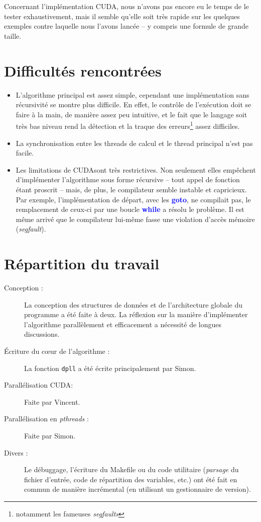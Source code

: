 \documentclass{article}
\newcommand{\keyword}[1]{\textbf{\textcolor{blue}{#1}}}
\newcommand{\code}[1]{\texttt{{#1}}}
\newcommand{\cuda}{\textsc{CUDA}}
\begin{document}
    Concernant l'implémentation \cuda, nous n'avons pas encore eu le temps de le tester exhaustivement, mais il semble qu'elle soit très rapide sur les quelques exemples contre laquelle nous l'avons lancée -- y compris une formule de grande taille.

\section{Difficultés rencontrées}
\begin{itemize}
    \item L'algorithme principal est assez simple, cependant une implémentation sans récursivité se montre plus difficile. En effet, le contrôle de l'exécution doit se faire à la main, de manière assez peu intuitive, et le fait que le langage soit très bas niveau rend la détection et la traque des erreurs\footnote{notamment les fameuses \emph{segfaults}} assez difficiles.
    \item La synchronisation entre les threads de calcul et le thread principal n'est pas facile.
    \item Les limitations de \cuda sont très restrictives. Non seulement elles empêchent d'implémenter l'algorithme sous forme récursive -- tout appel de fonction étant proscrit -- mais, de plus, le compilateur semble instable et capricieux. Par exemple, l'implémentation de départ, avec les \keyword{goto}, ne compilait pas, le remplacement de ceux-ci par une boucle \keyword{while} a résolu le problème. Il est même arrivé que le compilateur lui-même fasse une violation d'accès mémoire (\emph{segfault}).
\end{itemize}

\section{Répartition du travail}
\begin{description}
    \item[Conception :] La conception des structures de données et de l'architecture globale du programme a été faite à deux. La réflexion sur la manière d'implémenter l'algorithme parallèlement et efficacement a nécessité de longues discussions.
    \item[Écriture du cœur de l'algorithme :] La fonction \code{dpll} a été écrite principalement par Simon.
    \item[Parallélisation \cuda :] Faite par Vincent.
    \item[Parallélisation en \emph{pthreads} :] Faite par Simon.
    \item[Divers :] Le débuggage, l'écriture du Makefile ou du code utilitaire (\emph{parsage} du fichier d'entrée, code de répartition des variables, etc.) ont été fait en commun de manière incrémental (en utilisant un gestionnaire de version).
\end{description}
\end{document}
